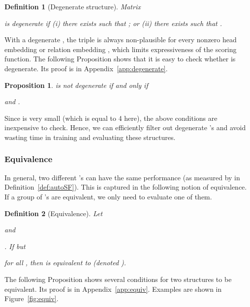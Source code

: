 \documentclass[10pt,journal,compsoc]{IEEEtran}
\newtheorem{prop}{Proposition}
\newtheorem{definition}{Definition}
\begin{document}
\begin{definition}[Degenerate structure]
Matrix
 
is degenerate
if (i) there exists 
such that ;
or (ii) there exists 
such that .
	\label{def:degenerate}
\end{definition}
With a degenerate ,
the triple  is always non-plausible for every nonzero
head embedding  or relation embedding ,
which limits expressiveness of the scoring function.
The following Proposition
shows that
it is easy to check whether  is degenerate.
Its proof is in Appendix~\ref{app:degenerate}.
\begin{prop} \label{pr:degenerate}
 is not degenerate if and only if

and
.
\end{prop}

Since   is very small (which is equal to 4 here), the above conditions are
inexpensive to check. Hence,
we can efficiently filter out degenerate 
's
and avoid wasting
time in training and evaluating these structures.







\subsubsection{Equivalence}
\label{sssec:equiv}

In general, two different 's can have the same performance (as measured by 
 in Definition~\ref{def:autoSF}).
This is captured in the following notion of equivalence.
If a group of 's are equivalent, we only need to evaluate one of them.

\begin{definition}[Equivalence]
	\label{def:equiv}
Let 

  and

.
If  but


for all 
,
then 
 is equivalent to 
(denoted ).	

\end{definition}

The following
Proposition
shows several conditions for two structures to be equivalent.
Its proof is in Appendix~\ref{app:equiv}.
Examples are shown in Figure~\ref{fig:equiv}.
\end{document}
